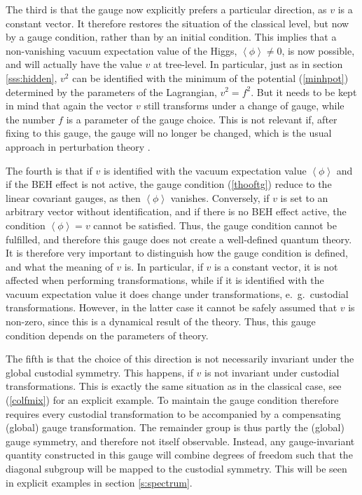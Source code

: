\documentclass[final,12pt,3p,longtitle]{elsarticle}
\newcommand*{\pref}[1]{(\ref{#1})}
\newcommand*{\1}{1\!\!\!\bot}
\newcommand*{\la}{\left\langle}
\newcommand*{\ra}{\right\rangle}
\begin{document}
The third is that the gauge now explicitly prefers a particular direction, as $v$ is a constant vector. It therefore restores the situation of the classical level, but now by a gauge condition, rather than by an initial condition. This implies that a non-vanishing vacuum expectation value of the Higgs, $\la \phi\ra\neq 0$, is now possible, and will actually have the value $v$ at tree-level. In particular, just as in section \ref{sss:hidden}, $v^2$ can be identified with the minimum of the potential \pref{minhpot} determined by the parameters of the Lagrangian, $v^2=f^2$. But it needs to be kept in mind that again the vector $v$ still transforms under a change of gauge, while the number $f$ is a parameter of the gauge choice. This is not relevant if, after fixing to this gauge, the gauge will no longer be changed, which is the usual approach in perturbation theory \cite{Bohm:2001yx}.

The fourth is that if $v$ is identified with the vacuum expectation value $\la\phi\ra$ and if the BEH effect is not active, the gauge condition \pref{thooftg} reduce to the linear covariant gauges, as then $\la\phi\ra$ vanishes. Conversely, if $v$ is set to an arbitrary vector without identification, and if there is no BEH effect active, the condition $\la\phi\ra=v$ cannot be satisfied. Thus, the gauge condition cannot be fulfilled, and therefore this gauge does not create a well-defined quantum theory. It is therefore very important to distinguish how the gauge condition is defined, and what the meaning of $v$ is. In particular, if $v$ is a constant vector, it is not affected when performing transformations, while if it is identified with the vacuum expectation value it does change under transformations, e.\ g.\ custodial transformations. However, in the latter case it cannot be safely assumed that $v$ is non-zero, since this is a dynamical result of the theory. Thus, this gauge condition depends on the parameters of theory.

The fifth is that the choice of this direction is not necessarily invariant under the global custodial symmetry. This happens, if $v$ is not invariant under custodial transformations. This is exactly the same situation as in the classical case, see \pref{colfmix} for an explicit example. To maintain the gauge condition therefore requires every custodial transformation to be accompanied by a compensating (global) gauge transformation. The remainder group is thus partly the (global) gauge symmetry, and therefore not itself observable. Instead, any gauge-invariant quantity constructed in this gauge will combine degrees of freedom such that the diagonal subgroup will be mapped to the custodial symmetry. This will be seen in explicit examples in section \ref{s:spectrum}.
\end{document}
